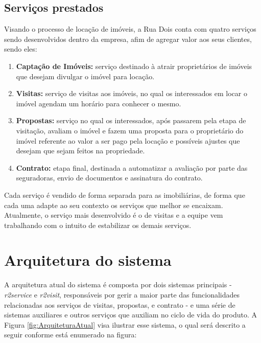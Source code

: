 
\subsection{Serviços prestados}

Visando o processo de locação de imóveis, a Rua Dois conta com quatro serviços
sendo desenvolvidos dentro da empresa, afim de agregar valor aos seus clientes,
sendo eles:

  \begin{enumerate}
    \item \textbf{Captação de Imóveis:} serviço destinado à atrair proprietários de
      imóveis que desejam divulgar o imóvel para locação.
    \item \textbf{Visitas:} serviço de visitas aos imóveis, no qual os interessados em
      locar o imóvel agendam um horário para conhecer o mesmo.
    \item \textbf{Propostas:} serviço no qual os interessados, após passarem pela etapa
      de visitação, avaliam o imóvel e fazem uma proposta para o proprietário do
      imóvel referente ao valor a ser pago pela locação e possíveis ajustes que
      desejam que sejam feitos na propriedade.
    \item \textbf{Contrato:} etapa final, destinada a automatizar a avaliação por parte
      das seguradoras, envio de documentos e assinatura do contrato.
  \end{enumerate}

Cada serviço é vendido de forma separada para as imobiliárias, de forma que cada uma
adapte ao seu contexto os serviços que melhor se encaixam. Atualmente, o serviço
mais desenvolvido é o de visitas e a equipe vem trabalhando com o intuito de
estabilizar os demais serviços.

\section{Arquitetura do sistema}

A arquitetura atual do sistema é composta por dois sistemas principais -
\textit{r2service} e \textit{r2visit}, responsáveis por gerir a maior parte
das funcionalidades relacionadas aos serviços de visitas, propostas, e contrato -
e uma série de sistemas auxiliares e outros serviços que auxiliam no ciclo de
vida do produto. A Figura \ref{fig:ArquiteturaAtual} visa ilustrar esse sistema,
o qual será descrito a seguir conforme está enumerado na figura:


